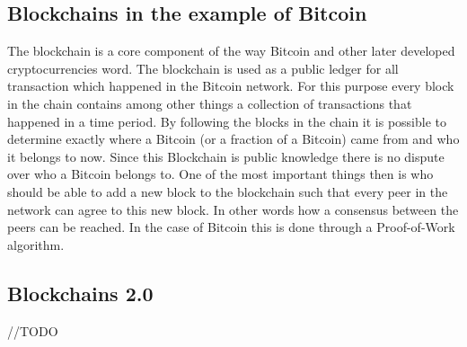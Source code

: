 \subsection{Blockchains in the example of Bitcoin}

The blockchain is a core component of the way Bitcoin and other later developed cryptocurrencies word. The blockchain is used as a public ledger for all transaction which happened in the Bitcoin
network. For this purpose every block in the chain contains among other things a collection of transactions that happened in a time period. By following the blocks in the chain it is possible to
determine exactly where a Bitcoin (or a fraction of a Bitcoin) came from and who it belongs to now. Since this Blockchain is public knowledge there is no dispute over who a Bitcoin belongs to.
One of the most important things then is who should be able to add a new block to the blockchain such that every peer in the network can agree to this new block. In other words how a consensus between
the peers can be reached. In the case of Bitcoin this is done through a Proof-of-Work algorithm.

\subsection{Blockchains 2.0}

//TODO
